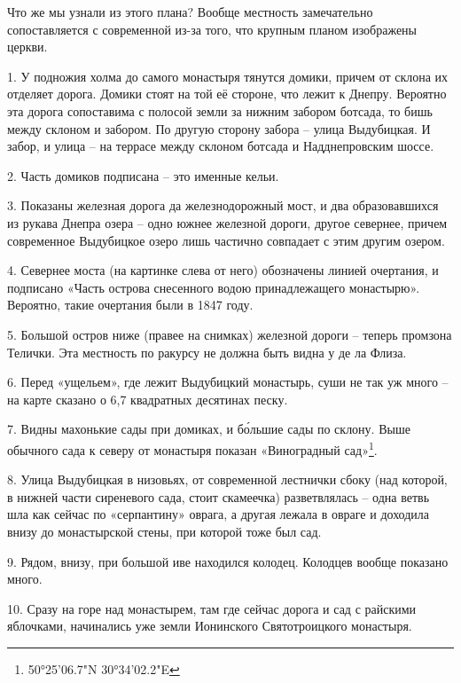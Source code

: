 Что же мы узнали из этого плана? Вообще местность замечательно сопоставляется с современной из-за того, что крупным планом изображены церкви.

1. У подножия холма до самого монастыря тянутся домики, причем от склона их отделяет дорога. Домики стоят на той её стороне, что лежит к Днепру. Вероятно эта дорога сопоставима с полосой земли за нижним забором ботсада, то бишь между склоном и забором. По другую сторону забора – улица Выдубицкая. И забор, и улица – на террасе между склоном ботсада и Надднепровским шоссе.

2. Часть домиков подписана – это именные кельи.


3. Показаны железная дорога да железнодорожный мост, и два образовавшихся из рукава Днепра озера – одно южнее железной дороги, другое севернее, причем современное Выдубицкое озеро лишь частично совпадает с этим другим озером.

4. Севернее моста (на картинке слева от него) обозначены линией очертания, и подписано «Часть острова снесенного водою принадлежащего монастырю». Вероятно, такие очертания были в 1847 году.

5. Большой остров ниже (правее на снимках) железной дороги – теперь промзона Телички. Эта местность по ракурсу не должна быть видна у де ла Флиза.

6. Перед «ущельем», где лежит Выдубицкий монастырь, суши не так уж много – на карте сказано о 6,7 квадратных десятинах песку.

7. Видны махонькие сады при домиках, и б\'ольшие сады по склону. Выше обычного сада к северу от монастыря показан «Виноградный сад»\footnote{50°25'06.7"N 30°34'02.2"E}.

8. Улица Выдубицкая в низовьях, от современной лестнички сбоку (над которой, в нижней части сиреневого сада, стоит скамеечка) разветвлялась – одна ветвь шла как сейчас по «серпантину» оврага, а другая лежала в овраге и доходила внизу до монастырской стены, при которой тоже был сад.

9. Рядом, внизу, при большой иве находился колодец. Колодцев вообще показано много.

10. Сразу на горе над монастырем, там где сейчас дорога и сад с райскими яблочками, начинались уже земли Ионинского Святотроицкого монастыря.

